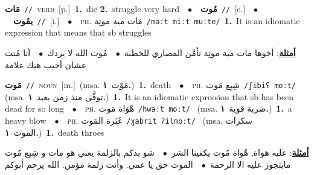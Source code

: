 \documentclass[10pt,a4paper,twoside]{article} %
\begin{document}
\begin{multicols}{2}
{\setlength\topsep{0pt}\textbf{\foreignlanguage{arabic}{مَات}}\ {\color{gray}\texttt{//}\color{black}}\ \textsc{verb}\ [p.]\ \textbf{1.}~die  \textbf{2.}~struggle very hard\ \ $\bullet$\ \ \setlength\topsep{0pt}\textbf{\foreignlanguage{arabic}{مُوت}}\ {\color{gray}\texttt{//}\color{black}}\ [c.]\ \ $\bullet$\ \ \setlength\topsep{0pt}\textbf{\foreignlanguage{arabic}{يمُوت}}\ {\color{gray}\texttt{//}\color{black}}\ [i.]\ \ $\bullet$\ \ \textsc{ph.} \color{gray} \foreignlanguage{arabic}{مَات مية موتِة}\color{black}\ {\color{gray}\texttt{/{\sffamily maːt miːt muːte}/}\color{black}}\ \textbf{1.}~It is an idiomatic expression that means that sb struggles\  \begin{flushright}\color{gray}\foreignlanguage{arabic}{\textbf{\underline{\foreignlanguage{arabic}{أمثلة}}}: أخوها مات مية موتِة تأمَّن المصاري للخطبة\ $\bullet$\ \  مُوت الله لا يردك\ $\bullet$\ \  أنا مُتت عشان أجيب هيك علامة}\end{flushright}\color{black}} \vspace{2mm}

{\setlength\topsep{0pt}\textbf{\foreignlanguage{arabic}{مَوت}}\ {\color{gray}\texttt{//}\color{black}}\ \textsc{noun}\ [m.]\ \color{gray}(msa. \foreignlanguage{arabic}{مَوْت}~\foreignlanguage{arabic}{\textbf{١.}})\color{black}\ \textbf{1.}~death\ \ $\bullet$\ \ \textsc{ph.} \color{gray} \foreignlanguage{arabic}{شِبِع مَوت}\color{black}\ {\color{gray}\texttt{/{\sffamily ʃibiʕ moːt}/}\color{black}}\ \color{gray} (msa. \foreignlanguage{arabic}{توفَّى منذ زمن بعيد}~\foreignlanguage{arabic}{\textbf{١.}})\color{black}\ \textbf{1.}~It is an idiomatic expression that sb has been dead for so long\ \ $\bullet$\ \ \textsc{ph.} \color{gray} \foreignlanguage{arabic}{هْوَاة مَوت}\color{black}\ {\color{gray}\texttt{/{\sffamily hwaːt moːt}/}\color{black}}\ \color{gray} (msa. \foreignlanguage{arabic}{ضربة قوية}~\foreignlanguage{arabic}{\textbf{١.}})\color{black}\ \textbf{1.}~a heavy blow\ \ $\bullet$\ \ \textsc{ph.} \color{gray} \foreignlanguage{arabic}{غَبَرة المَوت}\color{black}\ {\color{gray}\texttt{/{\sffamily ɣabrit ʔilmoːt}/}\color{black}}\ \color{gray} (msa. \foreignlanguage{arabic}{سكرات الموت}~\foreignlanguage{arabic}{\textbf{١.}})\color{black}\ \textbf{1.}~death throes\  \begin{flushright}\color{gray}\foreignlanguage{arabic}{\textbf{\underline{\foreignlanguage{arabic}{أمثلة}}}: عليه هواة, هْواة مُوت يكفينا الشر\ $\bullet$\ \  شو بدكم بالزلمة يعني هو مات و شِبِع مُوت مابتجوز عليه الا الرحمة\ $\bullet$\ \  الموت حق يا عمي. وأنت زلمة مؤمن. الله يرحم أبوكم}\end{flushright}\color{black}} \vspace{2mm}


\end{multicols}
\end{document}
